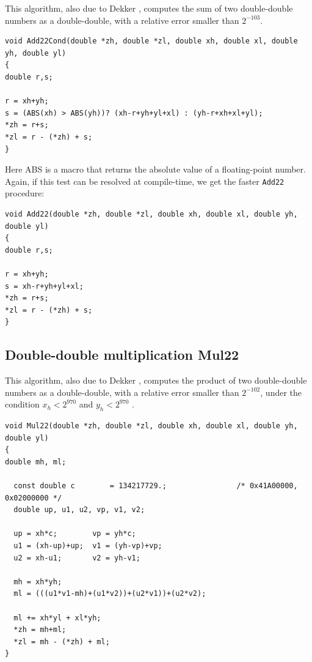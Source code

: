 This algorithm, also due to Dekker \cite{Dek71}, computes the sum of
two double-double numbers as a double-double, with a relative error
smaller than $2^{-103}$.

\begin{lstlisting}[label={Add22Cond},caption={Add22Cond},firstnumber=1]
void Add22Cond(double *zh, double *zl, double xh, double xl, double yh, double yl)
{
double r,s;

r = xh+yh;
s = (ABS(xh) > ABS(yh))? (xh-r+yh+yl+xl) : (yh-r+xh+xl+yl);
*zh = r+s;
*zl = r - (*zh) + s;
}
\end{lstlisting}

Here ABS is a macro that returns the absolute value of a
floating-point number. Again, if this test can be resolved at
compile-time, we get the faster \texttt{Add22} procedure:

\begin{lstlisting}[label={Add22},caption={Add22},firstnumber=1]
void Add22(double *zh, double *zl, double xh, double xl, double yh, double yl)
{
double r,s;

r = xh+yh;
s = xh-r+yh+yl+xl;
*zh = r+s;
*zl = r - (*zh) + s;
}
\end{lstlisting}




\subsection{Double-double multiplication {Mul22}}
  
This algorithm, also due to Dekker \cite{Dek71}, computes the product of
two double-double numbers as a double-double, with a relative error
smaller than $2^{-102}$, under the condition $x_h<2^{970}$ and $y_h<2^{970}$ . 

\begin{lstlisting}[label={Mul22},caption={Mul22},firstnumber=1]
void Mul22(double *zh, double *zl, double xh, double xl, double yh, double yl)
{
double mh, ml;

  const double c        = 134217729.;                /* 0x41A00000, 0x02000000 */ 
  double up, u1, u2, vp, v1, v2;

  up = xh*c;        vp = yh*c;
  u1 = (xh-up)+up;  v1 = (yh-vp)+vp;
  u2 = xh-u1;       v2 = yh-v1;
  
  mh = xh*yh;
  ml = (((u1*v1-mh)+(u1*v2))+(u2*v1))+(u2*v2);

  ml += xh*yl + xl*yh;
  *zh = mh+ml;
  *zl = mh - (*zh) + ml;
}  
\end{lstlisting}

